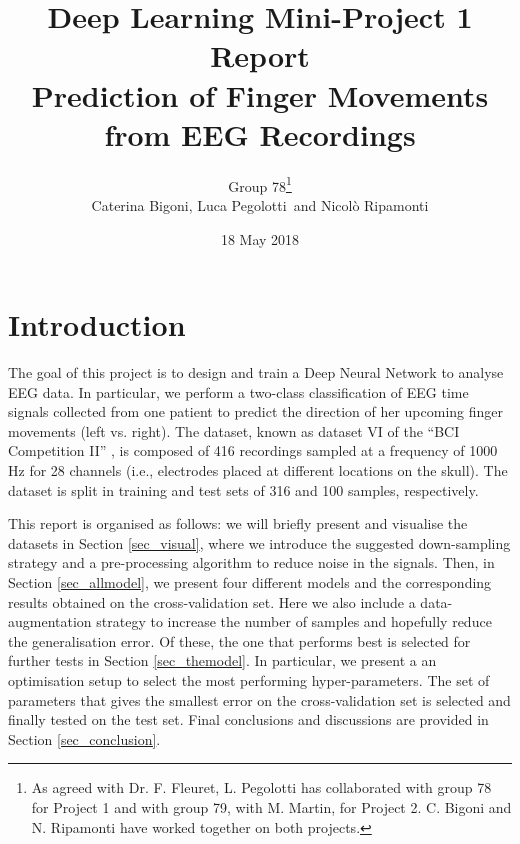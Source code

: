 \documentclass{article}
\begin{document}
\title{Deep Learning Mini-Project 1 Report \\ Prediction of Finger Movements from EEG Recordings}

\author{Group 78\footnote{As agreed with Dr. F. Fleuret, L. Pegolotti has collaborated with group 78 for Project 1 and with group 79, with M. Martin, for Project 2. C. Bigoni and N. Ripamonti have worked together on both projects.}\\ Caterina Bigoni, Luca Pegolotti \,and Nicol\`o Ripamonti}
\date{18 May 2018}
\maketitle





\section{Introduction}
 The goal of this project is to design and train a Deep Neural Network to analyse EEG data. 
 In particular, we perform a two-class classification of EEG time signals collected from one patient to predict the direction of her upcoming finger movements (left vs. right). 
 The  dataset,  known as dataset VI  of the ``BCI Competition II'' \cite{bci_ii}, is composed of 416 recordings  sampled at  a  frequency of 1000 Hz for 28 channels (i.e., electrodes placed at different locations on the skull).
The dataset is split in training and test sets of 316 and 100 samples, respectively. 

This report is organised as follows: we will briefly present and visualise the datasets in Section \ref{sec_visual}, where we introduce the suggested down-sampling strategy and a pre-processing algorithm to reduce  noise in the signals. 
Then, in Section \ref{sec_allmodel}, we  present four  different models and the corresponding results obtained on the cross-validation set.
Here we also include a data-augmentation strategy to increase the number of samples and hopefully reduce the generalisation error. 
Of these, the one that performs best is selected for further tests in Section \ref{sec_themodel}. 
In particular, we present a  an optimisation setup to select the most performing hyper-parameters.
The set of parameters that gives the smallest error on the cross-validation set is selected and finally tested on the test set.  
Final conclusions and discussions are provided in Section \ref{sec_conclusion}. 
\end{document}
